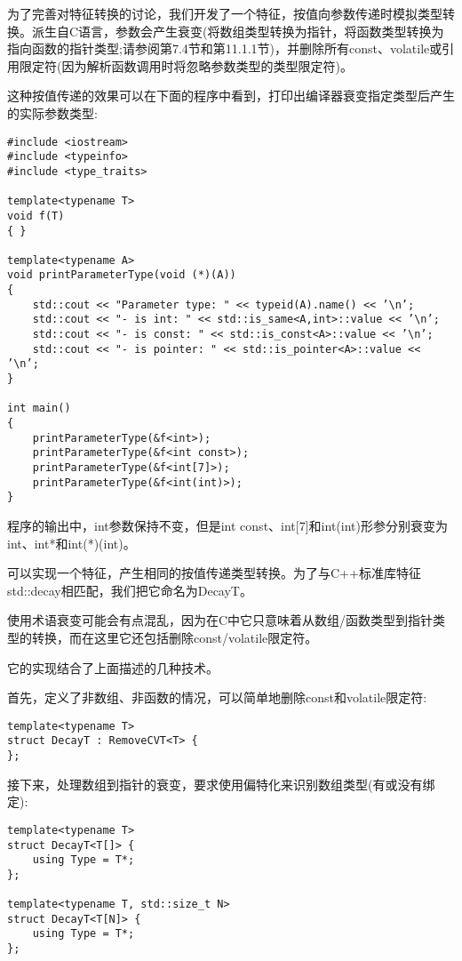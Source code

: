 为了完善对特征转换的讨论，我们开发了一个特征，按值向参数传递时模拟类型转换。派生自C语言，参数会产生衰变(将数组类型转换为指针，将函数类型转换为指向函数的指针类型;请参阅第7.4节和第11.1.1节)，并删除所有const、volatile或引用限定符(因为解析函数调用时将忽略参数类型的类型限定符)。

这种按值传递的效果可以在下面的程序中看到，打印出编译器衰变指定类型后产生的实际参数类型:

\begin{lstlisting}[style=styleCXX]
#include <iostream>
#include <typeinfo>
#include <type_traits>

template<typename T>
void f(T)
{ }

template<typename A>
void printParameterType(void (*)(A))
{
	std::cout << "Parameter type: " << typeid(A).name() << ’\n’;
	std::cout << "- is int: " << std::is_same<A,int>::value << ’\n’;
	std::cout << "- is const: " << std::is_const<A>::value << ’\n’;
	std::cout << "- is pointer: " << std::is_pointer<A>::value << ’\n’;
}

int main()
{
	printParameterType(&f<int>);
	printParameterType(&f<int const>);
	printParameterType(&f<int[7]>);
	printParameterType(&f<int(int)>);
}
\end{lstlisting}

程序的输出中，int参数保持不变，但是int const、int[7]和int(int)形参分别衰变为int、int*和int(*)(int)。

可以实现一个特征，产生相同的按值传递类型转换。为了与C++标准库特征std::decay相匹配，我们把它命名为DecayT。

\begin{tcolorbox}[colback=webgreen!5!white,colframe=webgreen!75!black]
\hspace*{0.75cm}使用术语衰变可能会有点混乱，因为在C中它只意味着从数组/函数类型到指针类型的转换，而在这里它还包括删除const/volatile限定符。
\end{tcolorbox}

它的实现结合了上面描述的几种技术。

首先，定义了非数组、非函数的情况，可以简单地删除const和volatile限定符:

\begin{lstlisting}[style=styleCXX]
template<typename T>
struct DecayT : RemoveCVT<T> {
};
\end{lstlisting}

接下来，处理数组到指针的衰变，要求使用偏特化来识别数组类型(有或没有绑定):

\begin{lstlisting}[style=styleCXX]
template<typename T>
struct DecayT<T[]> {
	using Type = T*;
};

template<typename T, std::size_t N>
struct DecayT<T[N]> {
	using Type = T*;
};
\end{lstlisting}


